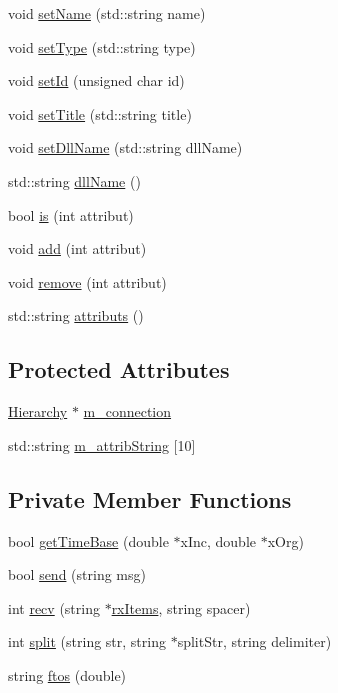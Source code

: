 \begin{DoxyCompactItemize}
void \hyperlink{classObject_ae30fea75683c2d149b6b6d17c09ecd0c}{setName} (std::string name)
\item 
void \hyperlink{classObject_aae534cc9d982bcb9b99fd505f2e103a5}{setType} (std::string type)
\item 
void \hyperlink{classObject_a398fe08cba594a0ce6891d59fe4f159f}{setId} (unsigned char id)
\item 
void \hyperlink{classObject_a89557dbbad5bcaa02652f5d7fa35d20f}{setTitle} (std::string title)
\item 
void \hyperlink{classObject_a870c5af919958c2136623b2d7816d123}{setDllName} (std::string dllName)
\item 
std::string \hyperlink{classObject_a2e3947f2870094c332d7454117f3ec63}{dllName} ()
\item 
bool \hyperlink{classAttrib_a704f26af560909ad22065083bb7d4c34}{is} (int attribut)
\item 
void \hyperlink{classAttrib_a235f773af19c900264a190b00a3b4ad7}{add} (int attribut)
\item 
void \hyperlink{classAttrib_a7d4ef7e32d93cb287792b87b857e79f3}{remove} (int attribut)
\item 
std::string \hyperlink{classAttrib_aee7bbf16b144887f196e1341b24f8a26}{attributs} ()
\end{DoxyCompactItemize}
\subsection*{Protected Attributes}
\begin{DoxyCompactItemize}
\item 
\hyperlink{classHierarchy}{Hierarchy} $\ast$ \hyperlink{classElement_abe3de7a5dbbc9a6dd2d7e012e5fdb266}{m\_\-connection}
\item 
std::string \hyperlink{classAttrib_a3414521d7a82476e874b25a5407b5e63}{m\_\-attribString} \mbox{[}10\mbox{]}
\end{DoxyCompactItemize}
\subsection*{Private Member Functions}
\begin{DoxyCompactItemize}
\item 
bool \hyperlink{classMSOxxxx_a9723e9234403d5eb74bde628fd78d56c}{getTimeBase} (double $\ast$xInc, double $\ast$xOrg)
\item 
bool \hyperlink{classMSOxxxx_ae77668a1ae4ccb74e0ed5f2485dfdebf}{send} (string msg)
\item 
int \hyperlink{classMSOxxxx_aa02e46a61e287ef1f5377e9e42399faf}{recv} (string $\ast$\hyperlink{classMSOxxxx_a847cae37181e9ec5f481edcc3fb19b1a}{rxItems}, string spacer)
\item 
int \hyperlink{classMSOxxxx_a46726c6d181a758bb4f598c66f336236}{split} (string str, string $\ast$splitStr, string delimiter)
\item 
string \hyperlink{classMSOxxxx_ab9c897c3dc0a52cbe5a5da67fc520ed7}{ftos} (double)
\end{DoxyCompactItemize}
